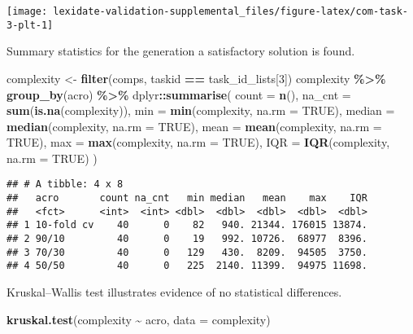 \documentclass[
]{book}
\newenvironment{Shaded}{\begin{snugshade}}{\end{snugshade}}
\newcommand{\AttributeTok}[1]{\textcolor[rgb]{0.13,0.29,0.53}{#1}}
\newcommand{\ConstantTok}[1]{\textcolor[rgb]{0.56,0.35,0.01}{#1}}
\newcommand{\DecValTok}[1]{\textcolor[rgb]{0.00,0.00,0.81}{#1}}
\newcommand{\FunctionTok}[1]{\textcolor[rgb]{0.13,0.29,0.53}{\textbf{#1}}}
\newcommand{\NormalTok}[1]{#1}
\newcommand{\OtherTok}[1]{\textcolor[rgb]{0.56,0.35,0.01}{#1}}
\newcommand{\SpecialCharTok}[1]{\textcolor[rgb]{0.81,0.36,0.00}{\textbf{#1}}}
\begin{document}
\texttt{[image: lexidate-validation-supplemental\_files/figure-latex/com-task-3-plt-1]}

Summary statistics for the generation a satisfactory solution is found.

\begin{Shaded}
\begin{Highlighting}[]
\NormalTok{complexity }\OtherTok{\textless{}{-}} \FunctionTok{filter}\NormalTok{(comps, taskid }\SpecialCharTok{==}\NormalTok{ task\_id\_lists[}\DecValTok{3}\NormalTok{])}
\NormalTok{complexity }\SpecialCharTok{\%\textgreater{}\%}
  \FunctionTok{group\_by}\NormalTok{(acro) }\SpecialCharTok{\%\textgreater{}\%}
\NormalTok{  dplyr}\SpecialCharTok{::}\FunctionTok{summarise}\NormalTok{(}
    \AttributeTok{count =} \FunctionTok{n}\NormalTok{(),}
    \AttributeTok{na\_cnt =} \FunctionTok{sum}\NormalTok{(}\FunctionTok{is.na}\NormalTok{(complexity)),}
    \AttributeTok{min =} \FunctionTok{min}\NormalTok{(complexity, }\AttributeTok{na.rm =} \ConstantTok{TRUE}\NormalTok{),}
    \AttributeTok{median =} \FunctionTok{median}\NormalTok{(complexity, }\AttributeTok{na.rm =} \ConstantTok{TRUE}\NormalTok{),}
    \AttributeTok{mean =} \FunctionTok{mean}\NormalTok{(complexity, }\AttributeTok{na.rm =} \ConstantTok{TRUE}\NormalTok{),}
    \AttributeTok{max =} \FunctionTok{max}\NormalTok{(complexity, }\AttributeTok{na.rm =} \ConstantTok{TRUE}\NormalTok{),}
    \AttributeTok{IQR =} \FunctionTok{IQR}\NormalTok{(complexity, }\AttributeTok{na.rm =} \ConstantTok{TRUE}\NormalTok{)}
\NormalTok{  )}
\end{Highlighting}
\end{Shaded}

\begin{verbatim}
## # A tibble: 4 x 8
##   acro       count na_cnt   min median   mean    max    IQR
##   <fct>      <int>  <int> <dbl>  <dbl>  <dbl>  <dbl>  <dbl>
## 1 10-fold cv    40      0    82   940. 21344. 176015 13874.
## 2 90/10         40      0    19   992. 10726.  68977  8396.
## 3 70/30         40      0   129   430.  8209.  94505  3750.
## 4 50/50         40      0   225  2140. 11399.  94975 11698.
\end{verbatim}

Kruskal--Wallis test illustrates evidence of no statistical differences.

\begin{Shaded}
\begin{Highlighting}[]
\FunctionTok{kruskal.test}\NormalTok{(complexity }\SpecialCharTok{\textasciitilde{}}\NormalTok{ acro, }\AttributeTok{data =}\NormalTok{ complexity)}
\end{Highlighting}
\end{Shaded}
\end{document}
